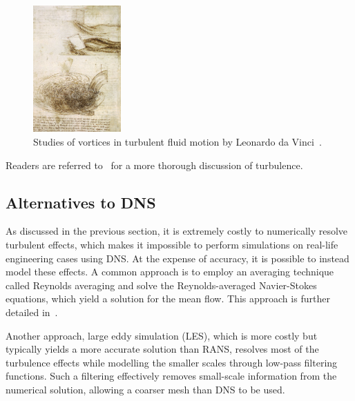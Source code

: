 \begin{figure}
    \centering
    \includegraphics[width=0.3\textwidth]{figs/vinci}
    \caption{Studies of vortices in turbulent fluid motion by Leonardo da Vinci~\cite{wiki:vinci}.}
    \label{fig:vinci}
\end{figure}

Readers are referred to~\cite{pope2001turbulent,wilcox1998turbulence} for a more thorough discussion of turbulence.

\subsection{Alternatives to DNS}
\label{sec:turbsolution}
As discussed in the previous section, it is extremely costly to numerically resolve turbulent effects, which makes it impossible to perform simulations on real-life engineering cases using DNS. At the expense of accuracy, it is possible to instead model these effects. A common approach is to employ an averaging technique called Reynolds averaging and solve the Reynolds-averaged Navier-Stokes equations, which yield a solution for the mean flow. This approach is further detailed in~.

Another approach, large eddy simulation (LES), which is more costly but typically yields a more accurate solution than RANS, resolves most of the turbulence effects while modelling the smaller scales through low-pass filtering functions. Such a filtering effectively removes small-scale information from the numerical solution, allowing a coarser mesh than DNS to be used.
%
